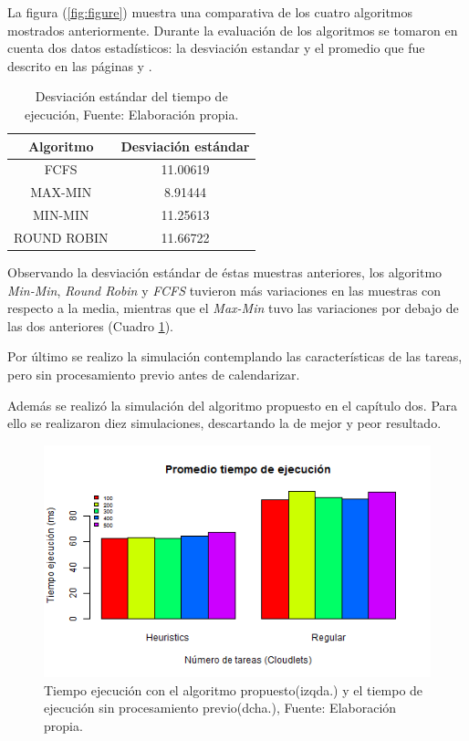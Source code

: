 La figura (\ref{fig:figure}) muestra una comparativa de los cuatro algoritmos mostrados anteriormente. Durante la evaluación de los algoritmos se tomaron en cuenta dos datos estadísticos: la desviación estandar y el promedio que fue descrito en las páginas \pageref{etiqueta} y \pageref{etiqueta2}.



\renewcommand\thetable{\arabic{table}}
\begin{table}[h!]
	\centering
	\begin{tabular}{@{}cc@{}}
		\toprule
		{\bf Algoritmo} & \multicolumn{1}{l}{{\bf Desviaci\'on est\'andar}} \\ \midrule
		FCFS & 11.00619 \\
		MAX-MIN & 8.91444 \\
		MIN-MIN & 11.25613 \\ 
		ROUND ROBIN & 11.66722 \\ \bottomrule
		
	\end{tabular}
	\caption{Desviaci\'on est\'andar del tiempo de ejecuci\'on, Fuente: Elaboraci\'on propia.}
	\label{tiempotabla}
\end{table}

Observando la desviaci\'on est\'andar de \'estas muestras anteriores, los algoritmo \textit{Min-Min}, \textit{Round Robin} y \textit{FCFS} tuvieron m\'as variaciones en las muestras con respecto a la media, mientras que el \textit{Max-Min} tuvo las variaciones por debajo de las dos anteriores (Cuadro \ref{tiempotabla}).


Por último se realizo la simulación contemplando las características de las tareas, pero sin procesamiento previo antes de calendarizar. 

Además se realizó la simulación del algoritmo propuesto en el capítulo dos. Para ello se realizaron diez simulaciones, descartando la de mejor y peor resultado.

\renewcommand\thefigure{\arabic{figure}}
\begin{figure}[h!] 
	\centering
	\includegraphics[scale=0.7]{media/tiempoFinal}
	\caption{Tiempo ejecuci\'on con el algoritmo propuesto(izqda.) y el tiempo de ejecución sin procesamiento previo(dcha.), Fuente: Elaboraci\'on propia.}
	\label{fig:timeF}
\end{figure}

